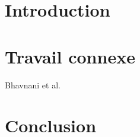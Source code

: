 \section{Introduction}
\vspace{0.2in}
\hspace*{0.16in}

\section{Travail connexe}
\vspace{0.2in}
\hspace*{0.16in}
Bhavnani et al. \textsuperscript{\cite{bhavnani2016segmentation}}

\section{Conclusion}
\vspace{0.1in}
\hspace*{0.16in}
